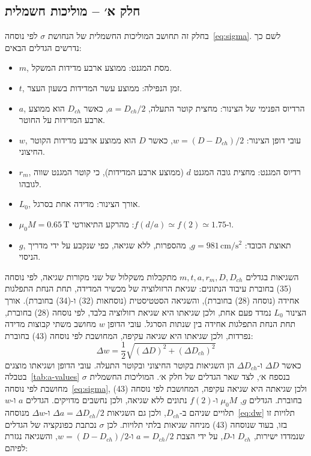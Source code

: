 \documentclass[10pt,a4paper]{article}
\newcommand{\U}[1]{\,\mathrm{#1}}
\begin{document}
\subsection*{חלק א׳ -- מוליכות חשמלית}
בחלק זה תחושב המוליכות החשמלית של הנחושת $\sigma$ לפי נוסחה~\eqref{eq:sigma}. לשם כך נדרשים הגדלים הבאים:
\begin{itemize}\setlength{\itemsep}{0pt}\setlength{\parskip}{0pt}
  \item $m$, מסת המגנט: ממוצע ארבע מדידות המשקל.
  \item $t$, זמן הנפילה: ממוצע עשר המדידות בשעון העצר.
  \item $a$, הרדיוס הפנימי של הצינור: מחצית קוטר התעלה, $a = D_{ch}/2$, כאשר $D_{ch}$ הוא ממוצע ארבע המדידות על החוטר.
  \item $w$, עובי דופן הצינור: $w = (D - D_{ch})/2$, כאשר $D$ הוא ממוצע ארבע מדידות הקוטר החיצוני.
  \item $r_m$, רדיוס המגנט: מחצית גובה המגנט $d$ (ממוצע ארבע המדידות), כי קוטר המגנט שווה לגובהו.
  \item $L_0$, אורך הצינור: מדידה אחת בסרגל.
  \item $\mu_0 M = 0.65\U{T}$ ו-$f(d/a) \simeq f(2) \simeq 1.75$: מהרקע התיאורטי.
  \item $g$, תאוצת הכובד: $g = 981\U{cm/s^2}$, מהספרות, ללא שגיאה, כפי שנקבע על ידי מדריך הניסוי.
\end{itemize}
השגיאות בגדלים $m, t, a, r_m, D, D_{ch}$ מתקבלות משקלול של שני מקורות שגיאה, לפי נוסחה (35) בחוברת עיבוד הנתונים: שגיאת הרזולוציה של מכשיר המדידה, תחת הנחת התפלגות אחידה (נוסחה (28) בחוברת), והשגיאה הסטטיסטית (נוסחאות (32) ו-(34) בחוברת).
אורך הצינור $L_0$ נמדד פעם אחת, ולכן שגיאתו היא שגיאת רזולוציה בלבד, לפי נוסחה (28) בחוברת, תחת הנחת התפלגות אחידה בין שנתות הסרגל.
עובי הדופן $w$ מחושב משתי קבוצות מדידה נפרדות, ולכן שגיאתו היא שגיאה עקיפה, המחושבת לפי נוסחה (43) בחוברת:
\begin{equation}\label{eq:dw}
\Delta w = \frac{1}{2}\sqrt{(\Delta D)^2 + (\Delta D_{ch})^2}
\end{equation}
כאשר $\Delta D$ ו-$\Delta D_{ch}$ הן השגיאות בקוטר החיצוני ובקוטר התעלה. עובי הדופן ושגיאתו מוצגים בטבלה~\ref{tab:a-values} בנספח א׳, לצד שאר הגדלים של חלק א׳.
המוליכות החשמלית $\sigma$ מחושבת לפי נוסחה~\eqref{eq:sigma}, ולכן שגיאתה היא שגיאה עקיפה, המחושבת לפי נוסחה (43) בחוברת. הגדלים $g$, $\mu_0 M$ ו-$f(2)$ נתונים ללא שגיאה, ולכן נחשבים מדויקים. הגדלים $a$ ו-$w$ תלויים שניהם ב-$D_{ch}$, ולכן גם השגיאות $\Delta a = \Delta D_{ch}/2$ ו-$\Delta w$ מנוסחה~\eqref{eq:dw} תלויות זו בזו, בעוד שנוסחה (43) מניחה שגיאות בלתי תלויות. לכן $\sigma$ נכתבת כפונקציה של הגדלים שנמדדו ישירות, $D_{ch}$ ו-$D$, על ידי הצבת $a = D_{ch}/2$ ו-$w = (D - D_{ch})/2$, והשגיאה נגזרת לפיהם:
\end{document}
